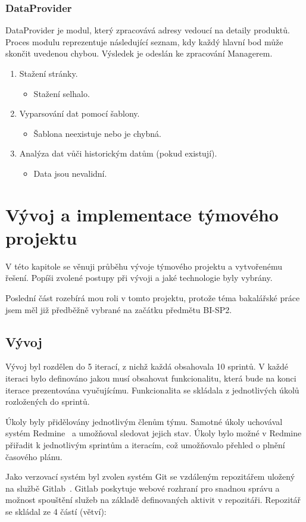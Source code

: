 \documentclass[thesis=B,czech]{FITthesis}[2012/06/26]
\begin{document}
\subsection{DataProvider}
DataProvider je modul, který zpracovává adresy vedoucí na detaily produktů. Proces modulu reprezentuje následující seznam, kdy každý hlavní bod může skončit uvedenou chybou. Výsledek je odeslán ke zpracování Managerem.
\par
\begin{enumerate}
	\item Stažení stránky.
	\begin{itemize}
	\item Stažení selhalo.
	\end{itemize}
	\item Vyparsování dat pomocí šablony.
	\begin{itemize}
	\item Šablona neexistuje nebo je chybná.
	\end{itemize}
	\item Analýza dat vůči historickým datům (pokud existují).
	\begin{itemize}
	\item Data jsou nevalidní.
	\end{itemize}
\end{enumerate}



\chapter{Vývoj a implementace týmového projektu}
V této kapitole se věnuji průběhu vývoje týmového projektu a vytvořenému řešení. Popíši zvolené postupy při vývoji a 
jaké technologie byly vybrány.
\par
Poslední část rozebírá mou roli v tomto
projektu, protože téma bakalářské práce jsem měl již předběžně vybrané na začátku předmětu BI-SP2.

\section{Vývoj}
Vývoj byl rozdělen do 5 iterací, z nichž každá obsahovala 10 sprintů. 
V každé iteraci bylo definováno jakou musí obsahovat funkcionalitu, která bude na konci iterace prezentována vyučujícímu. Funkcionalita se skládala z jednotlivých úkolů rozložených do sprintů.
\par
Úkoly byly přidělovány jednotlivým členům týmu. Samotné úkoly uchovával systém Redmine~\cite{Redmine} a umožňoval sledovat jejich stav.
Úkoly bylo možné v Redmine přiřadit k jednotlivým sprintům a iteracím, což umožňovalo přehled o plnění časového plánu.
\par
Jako verzovací systém byl zvolen systém Git se vzdáleným repozitářem uložený na službě Gitlab~\cite{gitlab}. Gitlab poskytuje webové rozhraní pro snadnou správu a možnost spouštění služeb na základě definovaných aktivit v repozitáři. Repozitář se skládal ze 4 částí (větví):
\end{document}
